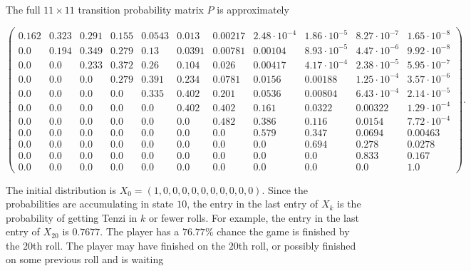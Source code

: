 \documentclass[12pt]{article}
\begin{document}
The full \( 11 \times 11 \) transition probability matrix \( P \) is
approximately
\begin{tiny}
    \[
        \begin{pmatrix}
            0.162 & 0.323 & 0.291 & 0.155 & 0.0543 & 0.013 & 0.00217 &
            2.48 \cdot {10^{-4}} & 1.86 \cdot {10^{-5}} & 8.27 \cdot {10^
            {-7}} & 1.65 \cdot {10^{-8}}\\
            0.0 & 0.194 & 0.349 & 0.279 & 0.13 & 0.0391 & 0.00781 &
            0.00104 & 8.93 \cdot {10^{-5}} & 4.47 \cdot {10^{-6}} & 9.92
            \cdot {10^{-8}}\\
            0.0 & 0.0 & 0.233 & 0.372 & 0.26 & 0.104 & 0.026 & 0.00417 &
            4.17 \cdot {10^{-4}} & 2.38 \cdot {10^{-5}} & 5.95 \cdot {10^
            {-7}}\\
            0.0 & 0.0 & 0.0 & 0.279 & 0.391 & 0.234 & 0.0781 & 0.0156 &
            0.00188 & 1.25 \cdot {10^{-4}} & 3.57 \cdot {10^{-6}}\\
            0.0 & 0.0 & 0.0 & 0.0 & 0.335 & 0.402 & 0.201 & 0.0536 &
            0.00804 & 6.43 \cdot {10^{-4}} & 2.14 \cdot {10^{-5}}\\
            0.0 & 0.0 & 0.0 & 0.0 & 0.0 & 0.402 & 0.402 & 0.161 & 0.0322
            & 0.00322 & 1.29 \cdot {10^{-4}}\\
            0.0 & 0.0 & 0.0 & 0.0 & 0.0 & 0.0 & 0.482 & 0.386 & 0.116 &
            0.0154 & 7.72 \cdot {10^{-4}}\\
            0.0 & 0.0 & 0.0 & 0.0 & 0.0 & 0.0 & 0.0 & 0.579 & 0.347 &
            0.0694 & 0.00463\\
            0.0 & 0.0 & 0.0 & 0.0 & 0.0 & 0.0 & 0.0 & 0.0 & 0.694 &
            0.278 & 0.0278\\
            0.0 & 0.0 & 0.0 & 0.0 & 0.0 & 0.0 & 0.0 & 0.0 & 0.0 & 0.833
            & 0.167\\
            0.0 & 0.0 & 0.0 & 0.0 & 0.0 & 0.0 & 0.0 & 0.0 & 0.0 & 0.0 &
            1.0
        \end{pmatrix}
        .
    \]
\end{tiny}
The initial distribution is \( X_0 = (1,0,0,0,0,0,0,0,0,0,0) \). Since
the probabilities are accumulating in state \( 10 \), the entry in the
last entry of \( X_k \) is the probability of getting Tenzi in \( k \)
or fewer rolls.  For example, the entry in the last entry of \( X_{20} \)
is \( 0.7677 \).  The player has a \( 76.77\% \) chance the game is
finished by the \( 20 \)th roll.  The player may have finished on the \(
20 \)th roll, or possibly finished on some previous roll and is waiting
\end{document}

